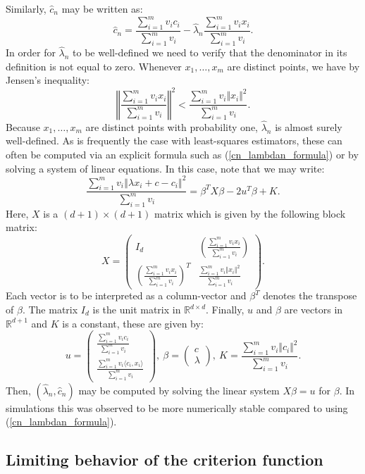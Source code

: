 \documentclass{article}
\newcommand{\RR}{\mathbb{R}}
\theoremstyle{plain}
\theoremstyle{remark}
\theoremstyle{definition}
\begin{document}
Similarly, $\hat{c}_n$ may be written as:
\[\hat{c}_n = \frac{\sum_{i=1}^m v_ic_i}{\sum_{i=1}^m v_i} - \hat{\lambda}_n\frac{\sum_{i=1}^m v_ix_i}{\sum_{i=1}^m v_i}.\]
In order for $\hat{\lambda}_n$ to be well-defined we need to verify that the denominator in its definition is not equal to zero. Whenever $x_1,\dots,x_m$ are distinct points, we have by Jensen's inequality:
\[\left\Vert \frac{\sum_{i=1}^m v_ix_i}{\sum_{i=1}^m v_i} \right\Vert^2 < \frac{\sum_{i=1}^m v_i\Vert x_i \Vert^2}{\sum_{i=1}^m v_i}.\]
Because $x_1,\dots,x_m$ are distinct points with probability one, $\hat{\lambda}_n$ is almost surely well-defined. As is frequently the case with least-squares estimators, these can often be computed via an explicit formula such as (\ref{cn_lambdan_formula}) or by solving a system of linear equations. In this case, note that we may write:
\[\frac{\sum_{i=1}^m v_i\left\Vert \lambda x_i + c - c_i \right\Vert^2}{\sum_{i=1}^m v_i} = \beta^TX\beta - 2u^T\beta + K.\]
Here, $X$ is a $(d+1)\times (d+1)$ matrix which is given by the following block matrix:
\[X = \begin{pmatrix}
        I_d & \left( \frac{\sum_{i=1}^m v_ix_i}{\sum_{i=1}^m v_i} \right)\\
        \left( \frac{\sum_{i=1}^m v_ix_i}{\sum_{i=1}^m v_i} \right)^T & \frac{\sum_{i=1}^m v_i\Vert x_i \Vert^2}{\sum_{i=1}^m v_i}
    \end{pmatrix}.\]
Each vector is to be interpreted as a column-vector and $\beta^T$ denotes the transpose of $\beta$. The matrix $I_d$ is the unit matrix in $\RR^{d\times d}$. Finally, $u$ and $\beta$ are vectors in $\RR^{d+1}$ and $K$ is a constant, these are given by:
\[u=\begin{pmatrix}
        \frac{\sum_{i=1}^m v_ic_i}{\sum_{i=1}^m v_i} \\
        \frac{\sum_{i=1}^m v_i\langle c_i,x_i\rangle}{\sum_{i=1}^m v_i}
    \end{pmatrix}, \ \beta = \begin{pmatrix}
        c\\
        \lambda
    \end{pmatrix}, \
K= \frac{\sum_{i=1}^m v_i\Vert c_i \Vert^2}{\sum_{i=1}^m v_i}.\]
Then, $(\hat{\lambda}_n, \hat{c}_n)$ may be computed by solving the linear system $X\beta = u$ for $\beta$. In simulations this was observed to be more numerically stable compared to using (\ref{cn_lambdan_formula}).

\subsection{Limiting behavior of the criterion function}
\end{document}
